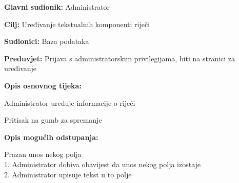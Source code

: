 					\noindent {}
					\begin{packed_item}
						\item \textbf{Glavni sudionik:} Administrator
						\item \textbf{Cilj:} Uređivanje tekstualnih komponenti riječi
						\item \textbf{Sudionici:} Baza podataka
						\item \textbf{Preduvjet:} Prijava s administratorskim privilegijama, biti na stranici za uređivanje
						\item \textbf{Opis osnovnog tijeka:}
						\begin{packed_enum}
							\item Administrator uređuje informacije o riječi
							\item Pritisak na gumb za spremanje
						\end{packed_enum}
						\item \textbf{Opis mogućih odstupanja:}
						\begin{packed_item}
							\item [2.a] Prazan unos nekog polja
							\\1. Administrator dobiva obavijest da unos nekog polja izostaje
							\\2. Administrator upisuje tekst u to polje
						\end{packed_item}
					\end{packed_item}
					
